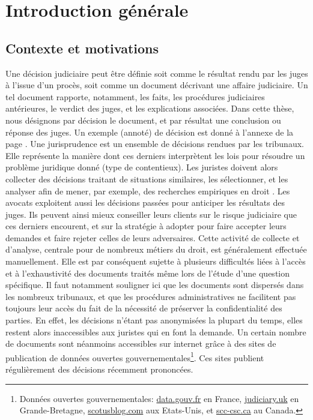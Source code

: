 
\chapter*{Introduction générale}
\label{chap:intro}


\section{Contexte et motivations}
\label{sec:intro:contexte}
Une décision judiciaire peut être définie soit comme  le résultat rendu par les juges à l'issue d'un procès, soit comme un document décrivant une affaire judiciaire. Un tel document rapporte, notamment,  les faits, les procédures judiciaires antérieures, le verdict des juges, et les explications associées. Dans cette thèse, nous désignons par \og décision \fg{} le document, et par  \og résultat\fg{} une conclusion ou réponse des juges. Un exemple (annoté) de décision est donné à l'annexe de la page \pageref{appendix:exemple-decision}. Une jurisprudence
est un ensemble de décisions rendues par les tribunaux. Elle représente la manière dont ces derniers interprètent les lois pour résoudre un problème juridique donné (type de contentieux). Les juristes doivent alors collecter des décisions traitant de situations similaires, les sélectionner, et les analyser afin de mener, par exemple, des recherches empiriques en droit \citep{ancel2003expulsion, jeandidier2006pensions}. Les avocats exploitent aussi les décisions passées pour anticiper les résultats des juges. Ils peuvent ainsi mieux conseiller leurs clients sur le risque judiciaire que ces derniers encourent, et sur la stratégie à adopter pour faire accepter leurs demandes et faire rejeter celles de leurs adversaires. Cette activité de collecte et d'analyse, centrale pour de nombreux métiers du droit, est généralement effectuée manuellement. Elle est par conséquent sujette à plusieurs difficultés liées à l'accès et à l'exhaustivité des documents traités même lors de l'étude d'une question spécifique. Il faut notamment souligner ici que les documents sont dispersés dans les nombreux tribunaux, et que les procédures administratives ne facilitent pas toujours leur accès du fait de la nécessité de préserver la confidentialité des parties. En effet, les décisions n'étant pas \og anonymisées \fg{} la plupart du temps, elles restent alors inaccessibles aux juristes qui en font la demande. Un certain nombre de documents sont néanmoins accessibles sur internet grâce à des sites de publication de données ouvertes gouvernementales\footnote{Données ouvertes gouvernementales: \hyperlink{http://data.gouv.fr}{data.gouv.fr} en France, \hyperlink{https://www.judiciary.uk}{judiciary.uk} en Grande-Bretagne, \hyperlink{http://www.scotusblog.com/}{scotusblog.com} aux Etats-Unis, et \hyperlink{https://www.scc-csc.ca/}{scc-csc.ca} au Canada.}. Ces sites publient régulièrement des décisions récemment prononcées. 

